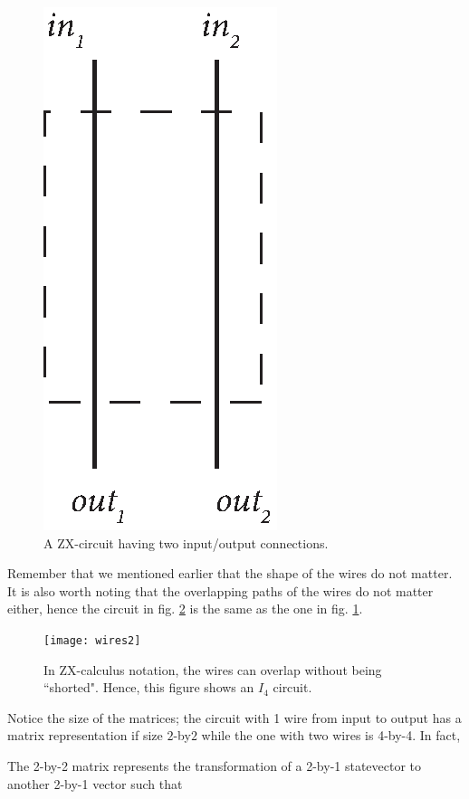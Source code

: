 \begin{figure}[ht]
    \centering
    \includegraphics[scale = 0.45]{Figures/wires2-straight.eps}
    \caption{A ZX-circuit having two input/output connections.}
    \label{fig:wires2}
\end{figure}

Remember that we mentioned earlier that the shape of the wires do not matter. It is also worth noting that the overlapping paths of the wires do not matter either, hence the circuit in fig. \ref{fig:wires2-overlap} is the same as the one in fig. \ref{fig:wires2}.

\begin{figure}[ht]
    \centering
    \texttt{[image: wires2]}
    \caption{In ZX-calculus notation, the wires can overlap without being ``shorted". Hence, this figure shows an $I_4$ circuit.}
    \label{fig:wires2-overlap}
\end{figure}

Notice the size of the matrices; the circuit with 1 wire from input to output has a matrix representation if size $2$-by$2$ while the one with two wires is 4-by-4. In fact, 

The 2-by-2 matrix represents the transformation of a 2-by-1 statevector to another 2-by-1 vector such that


